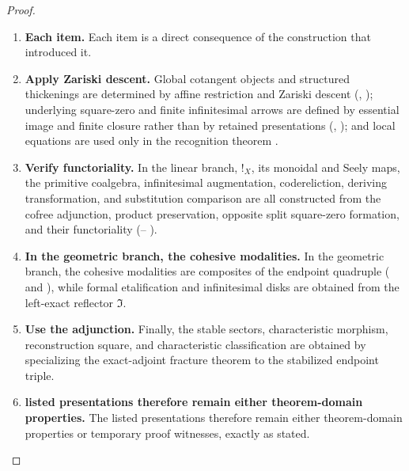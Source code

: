 \begin{proof}
\leavevmode
\begin{enumerate}[label=\textup{(\arabic*)}]
    \item \textbf{Each item.}
    Each item is a direct consequence of the construction that introduced it.

    \item \textbf{Apply Zariski descent.}
    Global cotangent objects and structured thickenings are determined by affine restriction and
    Zariski descent (,
    ); underlying square-zero and finite
    infinitesimal arrows are defined by essential image and finite closure rather than by
    retained presentations (,
    ); and local equations are used only in
    the recognition theorem .

    \item \textbf{Verify functoriality.}
    In the linear branch, \(!_X\), its monoidal and Seely maps, the primitive coalgebra,
    infinitesimal augmentation, codereliction, deriving transformation, and substitution
    comparison are all constructed from the cofree adjunction, product preservation, opposite
    split square-zero formation, and their functoriality
    (-- ).

    \item \textbf{In the geometric branch, the cohesive modalities.}
    In the geometric branch, the cohesive modalities are composites of the endpoint quadruple
    ( and
    ), while formal etalification and
    infinitesimal disks are obtained from the left-exact reflector \(\Im\).

    \item \textbf{Use the adjunction.}
    Finally, the stable sectors, characteristic morphism, reconstruction square, and
    characteristic classification are obtained by specializing the exact-adjoint fracture
    theorem  to the stabilized endpoint triple.

    \item \textbf{listed presentations therefore remain either theorem-domain properties.}
    The listed presentations therefore remain either theorem-domain properties or temporary
    proof witnesses, exactly as stated.
\end{enumerate}
\end{proof}

